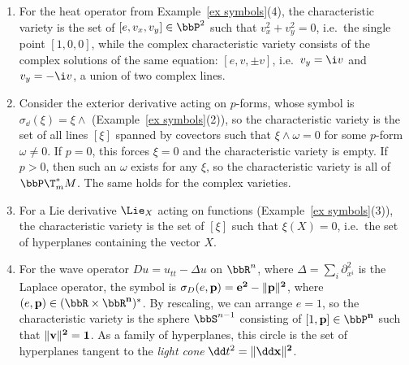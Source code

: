 \begin{example}
    \begin{enumerate}
        \item For the heat operator from Example~\ref{ex symbols}(4), the characteristic variety is the set of $[e,v_x,v_y]\in\bbP^2$ such that $v_x^2+v_y^2=0$, i.e.\ the single point $[1,0,0]$, while the complex characteristic variety consists of the complex solutions of the same equation: $[e,v,\pm v]$, i.e.\ $v_y=\i v$ and $v_y=-\i v$, a union of two complex lines.
        \item Consider the exterior derivative acting on $p$-forms, whose symbol is $\sigma_{\dd}(\xi)=\xi\wedge$ (Example~\ref{ex symbols}(2)), so the characteristic variety is the set of all lines $[\xi]$ spanned by covectors such that $\xi\wedge\omega=0$ for some $p$-form $\omega\neq 0$. If $p=0$, this forces $\xi=0$ and the characteristic variety is empty. If $p>0$, then such an $\omega$ exists for any $\xi$, so the characteristic variety is all of $\bbP \T^\ast_m M$. The same holds for the complex varieties.
        \item For a Lie derivative $\Lie_X$ acting on functions (Example~\ref{ex symbols}(3)), the characteristic variety is the set of $[\xi]$ such that $\xi(X)=0$, i.e.\ the set of hyperplanes containing the vector $X$.
        \item For the wave operator $Du=u_{tt}-\Delta u$ on $\bbR^n$, where $\Delta=\sum_i \partial_{x^i}^2$ is the Laplace operator, the symbol is $\sigma_D(e,\bf{p})=e^2-\lVert\bf{p}\rVert^2$, where $(e,\bf{p})\in (\bbR\times\bbR^n)^\ast$. By rescaling, we can arrange $e=1$, so the characteristic variety is the sphere $\bbS^{n-1}$ consisting of $[1,\bf{p}]\in \bbP^n$ such that $\lVert\bf{v}\rVert^2=1$. As a family of hyperplanes, this circle is the set of hyperplanes tangent to the \emph{light cone} $\dd t^2=\lVert\dd \bf{x}\rVert^2$.
    \end{enumerate}
\end{example}


